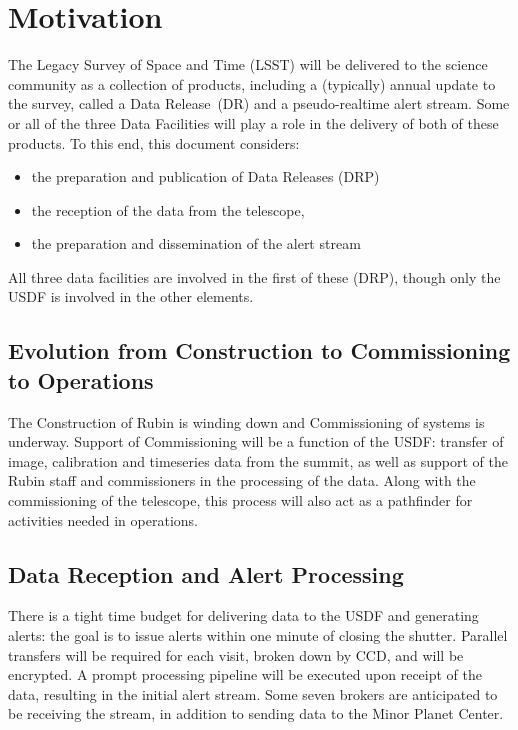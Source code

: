 \section{Motivation}
\label{sec:motivation}

The Legacy Survey of Space and Time (LSST) will be delivered to the science community as a collection of products, including a (typically) annual update to the survey, called a Data Release~(DR) and a pseudo-realtime alert stream. Some or all of the three Data Facilities will play a role in the delivery of both of these products. To this end, this document considers:

\begin{itemize}

\item the preparation and publication of Data Releases (DRP)

\item the reception of the data from the telescope,

\item the preparation and dissemination of the alert stream

\end{itemize}

All three data facilities are involved in the first of these (DRP),
though only the USDF is involved in the other elements.


\subsection{Evolution from Construction to Commissioning to Operations}

The Construction of Rubin is winding down and Commissioning of systems is underway. Support of Commissioning will be a function of the USDF: transfer of image, calibration and timeseries data from the summit, as well as support of the Rubin staff and commissioners in the processing of the data. Along with the commissioning of the telescope, this process will also act as a pathfinder for activities needed in operations.


\subsection{Data Reception and Alert Processing}

There is a tight time budget for delivering data to the USDF and generating alerts: the goal is to issue alerts within one minute of closing the shutter. Parallel transfers will be required for each visit, broken down by CCD, and will be encrypted. A prompt processing pipeline will be executed upon receipt of the data, resulting in the initial alert stream. Some seven brokers are anticipated to be receiving the stream, in addition to sending data to the Minor Planet Center.


